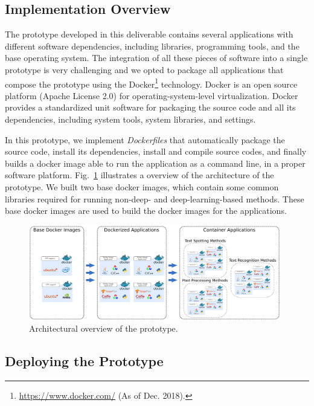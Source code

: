 \subsection{Implementation Overview}
\label{sec:implementation}


The prototype developed in this deliverable contains several applications with different software dependencies, including libraries, programming tools, and the base operating system. The integration of all these pieces of software into a single prototype is very challenging and we opted to package all applications that compose the prototype using the Docker\footnote{\url{https://www.docker.com/} (As of Dec. 2018).} technology. Docker is an open source platform (Apache License 2.0) for operating-system-level virtualization. Docker provides a standardized unit software for packaging the source code and all its dependencies, including system tools, system libraries, and settings.

In this prototype, we implement \textit{Dockerfiles} that automatically package the source code, install its dependencies, install and compile source codes, and finally builds a docker image able to run the application as a command line, in a proper software platform. Fig.~\ref{fig:overview-prototype} illustrates a overview of the architecture of the prototype. We built two base docker images, which contain some common libraries required for running non-deep- and deep-learning-based methods. These base docker images are used to build the docker images for the applications.
%
\begin{figure}
    \centering
    \includegraphics[width=0.98\textwidth]{figs/prototype-overview.pdf}
    \caption{Architectural overview of the prototype.}
    \label{fig:overview-prototype}
\end{figure}


\subsection{Deploying the Prototype}
\label{sec:instalation}

